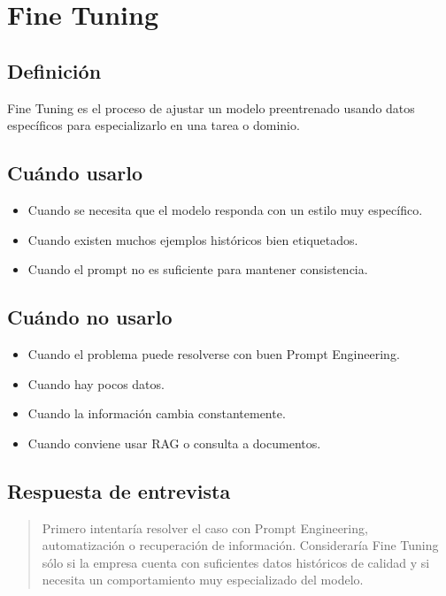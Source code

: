 \documentclass[12pt]{article}
\begin{document}
\section{Fine Tuning}

\subsection{Definición}

Fine Tuning es el proceso de ajustar un modelo preentrenado usando datos específicos para especializarlo en una tarea o dominio.

\subsection{Cuándo usarlo}

\begin{itemize}
    \item Cuando se necesita que el modelo responda con un estilo muy específico.
    \item Cuando existen muchos ejemplos históricos bien etiquetados.
    \item Cuando el prompt no es suficiente para mantener consistencia.
\end{itemize}

\subsection{Cuándo no usarlo}

\begin{itemize}
    \item Cuando el problema puede resolverse con buen Prompt Engineering.
    \item Cuando hay pocos datos.
    \item Cuando la información cambia constantemente.
    \item Cuando conviene usar RAG o consulta a documentos.
\end{itemize}

\subsection{Respuesta de entrevista}

\begin{quote}
Primero intentaría resolver el caso con Prompt Engineering, automatización o recuperación de información. Consideraría Fine Tuning sólo si la empresa cuenta con suficientes datos históricos de calidad y si necesita un comportamiento muy especializado del modelo.
\end{quote}
\end{document}

